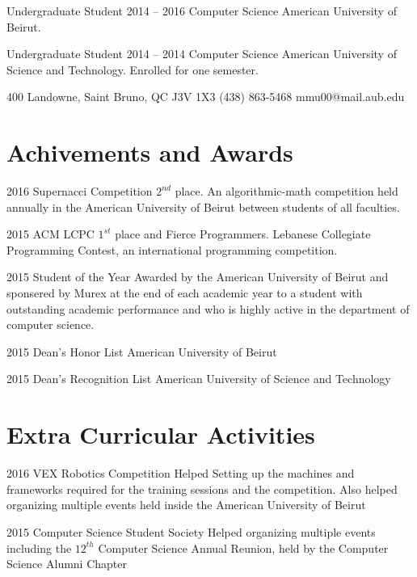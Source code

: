 \documentclass{tccv}
\begin{document}
\begin{yearlist}

\item[Undergraduate Student]{2014 -- 2016}
     {Computer Science} 
     {American University of Beirut.}


\item[Undergraduate Student]{2014 -- 2014}
     {Computer Science} 
     {American University of Science and Technology. Enrolled for one semester.}

\end{yearlist}

\personal
    {400 Landowne, Saint Bruno, QC J3V 1X3}
    {(438) 863-5468}
    {mmu00@mail.aub.edu}

\section{Achivements and Awards}

\begin{yearlist}

\item{2016}
     {Supernacci Competition}
     {$2^{nd}$ place. An algorithmic-math competition held annually in the American University of Beirut between students of all faculties.}

\item{2015}
     {ACM LCPC}
     {$1^{st}$ place and Fierce Programmers. Lebanese Collegiate Programming Contest, an international programming competition.}

\item{2015}
     {Student of the Year}
     {Awarded by the American University of Beirut and sponsered by Murex at the end of each academic year to a student with outstanding academic performance and who is highly active in the department of computer science.}

\item{2015}
     {Dean's Honor List}
     {American University of Beirut}

\item{2015}
     {Dean's Recognition List}
     {American University of Science and Technology}

\end{yearlist}

\section{Extra Curricular Activities}
\begin{yearlist}
\item{2016}
     {VEX Robotics Competition}
     {Helped Setting up the machines and frameworks required for the training sessions and the competition. Also helped organizing multiple events held inside the American University of Beirut}


\item{2015}
     {Computer Science Student Society}
     {Helped organizing multiple events including the $12^{th}$ Computer Science Annual Reunion, held by the Computer Science Alumni Chapter}

\end{yearlist}
\end{document}
